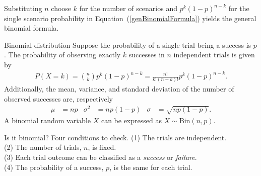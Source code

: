 Substituting $n$ choose $k$ for the number of scenarios and $p^k(1-p)^{n-k}$ for the single scenario probability in Equation~(\ref{genBinomialFormula}) yields the general binomial formula. 

\textD{\newpage}

\begin{onebox}{Binomial distribution}
Suppose the probability of a single trial being a success is $p$. The probability of observing exactly $k$ successes in $n$ independent trials is given by\vspace{-1mm}
\begin{eqnarray}
P(X = k) = {n\choose k}p^k(1-p)^{n-k} = \frac{n!}{k!(n-k)!}p^k(1-p)^{n-k}.
\label{binomialFormula}
\end{eqnarray}
Additionally, the mean, variance, and standard deviation of the number of observed successes are, respectively\vspace{-2mm}
\begin{align}
\mu &= np
  &\sigma^2 &= np(1-p)
  &\sigma &= \sqrt{np(1-p)}.
\label{binomialStats}
\end{align}
A binomial random variable $X$ can be expressed as $X \sim \textrm{Bin}(n, p)$.
\end{onebox}%

\begin{onebox}{Is it binomial? Four conditions to check.}
\label{isItBinomialTipBox}%
(1) The trials are independent. \\
(2) The number of trials, $n$, is fixed. \\
(3) Each trial outcome can be classified as a \emph{success} or \emph{failure}. \\
(4) The probability of a success, $p$, is the same for each trial.
\end{onebox}

